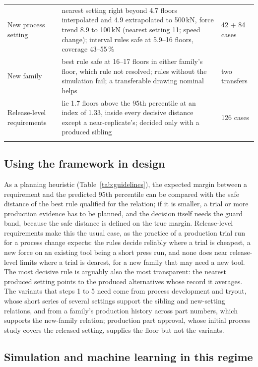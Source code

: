 \documentclass[pdflatex,sn-basic,lineno]{sn-jnl}
\providecommand{\DIFaddendFL}{} %
\DeclareRobustCommand{\DIFaddendFL}{\DIFOaddendFL \let\includegraphics\DIFOincludegraphics} %
\begin{document}
\begin{table}[t]
\begin{tabular}{@{}L{2.9cm}L{7.75cm}L{1.85cm}@{}}
New process setting & nearest setting right beyond 4.7 floors interpolated and 4.9 extrapolated to 500\,kN, force trend 8.9 to 100\,kN (nearest setting 11; speed change); interval rules safe at 5.9--16 floors, coverage 43--55\,\% & 42 + 84 cases \\
New family & best rule safe at 16--17 floors in either family's floor, which rule not resolved; rules without the simulation fail; a transferable drawing nominal helps & two transfers \\
Release-level requirements & lie 1.7 floors above the 95th percentile at an index of 1.33, inside every decisive distance except a near-replicate's; decided only with a produced sibling & 126 cases \\
\botrule
\end{tabular}
\DIFaddendFL \end{table}

\subsection{Using the framework in design}

As a planning heuristic (Table~\ref{tab:guidelines}), the expected margin between a requirement and the predicted 95th percentile can be compared with the safe distance of the best rule qualified for the relation; if it is smaller, a trial or more production evidence has to be planned, and the decision itself needs the guard band, because the safe distance is defined on the true margin. Release-level requirements make this the usual case, as the practice of a production trial run for a process change expects: the rules decide reliably where a trial is cheapest, a new force on an existing tool being a short press run, and none does near release-level limits where a trial is dearest, for a new family that may need a new tool. The most decisive rule is arguably also the most transparent: the nearest produced setting points to the produced alternatives whose record it averages. The variants that steps 1 to 5 need come from process development and tryout, whose short series of several settings support the sibling and new-setting relations, and from a family's production history across part numbers, which supports the new-family relation; production part approval, whose initial process study covers the released setting, supplies the floor but not the variants.

\subsection{Simulation and machine learning in this regime}
\end{document}
